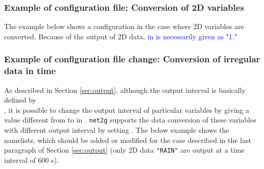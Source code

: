 \subsubsection{Example of configuration file: Conversion of 2D variables}
The example below shows a configuration in the case where 2D variables are converted. Because of the output of 2D data,
\textcolor{blue}{ in  is necessarily given as "1."}

\subsubsection{Example of configuration file change: Conversion of irregular data in time}

As described in Section \ref{sec:output},
although the output interval is basically defined by \\ ,
it is possible to change the output interval of particular variables
by giving a value different from  to  in .
\verb|net2g| supports the data conversion of these variables with different output interval by setting .
The below example shows the namelists, which should be added or modified
for the case described in the last paragraph of Section \ref{sec:output}
(only 2D data \verb|"RAIN"| are output at a time interval of 600 s).

